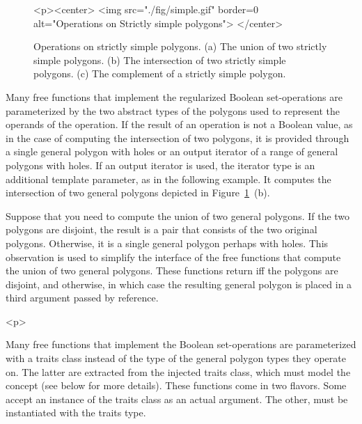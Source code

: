 \begin{figure}[!htp]
\begin{ccTexOnly}

\end{ccTexOnly}
\begin{ccHtmlOnly}
  <p><center>
    <img src="./fig/simple.gif" border=0 alt="Operations on Strictly
    simple polygons">
  </center>
\end{ccHtmlOnly}
\caption{\label{fig:simple}Operations on strictly simple polygons. (a) The union of two
strictly simple polygons. (b) The intersection of two strictly simple
polygons. (c) The complement of a strictly simple polygon.} 
\end{figure}

Many free functions that implement the regularized Boolean 
set-operations are parameterized by the two abstract types of the polygons 
used to represent the operands of the operation. 
If the result of an operation is not a Boolean value, as in the case of 
computing the intersection of two polygons, it is provided through a single 
general polygon with holes or an output iterator of a range of general
polygons with holes. If an output iterator is used, the iterator type is an 
additional template parameter, as in the following example. It 
computes the intersection of two general polygons depicted in 
Figure~\ref{fig:simple}~(b).


Suppose that you need to compute the union of two general polygons. If the
two polygons are disjoint, the result is a pair that consists of the two 
original polygons. Otherwise, it is a single general polygon perhaps with 
holes. This observation is used to simplify the interface of the free
functions that compute the union of two general polygons. These functions
return  iff the polygons are disjoint, and  otherwise,
in which case the resulting general polygon is placed in a third argument 
passed by reference.

\begin{ccHtmlOnly}<p>\end{ccHtmlOnly}
Many free functions that implement the Boolean set-operations are
parameterized with a traits class instead of the type of the general
polygon types they operate on. The latter are extracted from the injected
traits class, which must model the concept 
 (see below for more details).
These functions come in two flavors. Some accept an instance of the traits 
class as an actual argument. The other, must be instantiated with the 
traits type.

